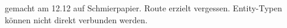 \documentclass{lehramt-informatik-haupt}
\begin{document}
\begin{antwort}[falsch]
gemacht am 12.12 auf Schmierpapier. Route erzielt vergessen. Entity-Typen
können nicht direkt verbunden werden.
\end{antwort}

%



%


\end{document}
